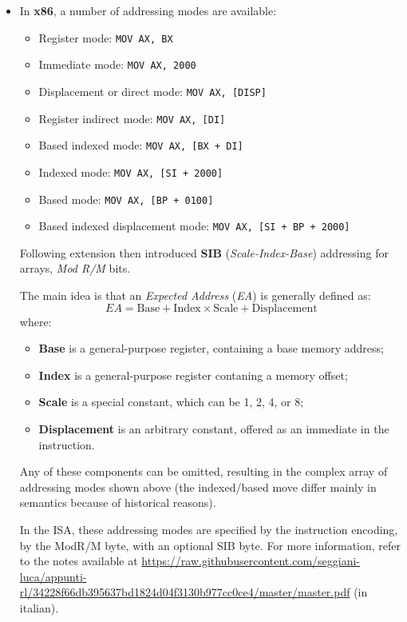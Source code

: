 \documentclass[a4paper,11pt]{article}
\begin{document}
\begin{itemize}
	\item In \textbf{x86}, a number of addressing modes are available:
	\begin{itemize}
		\item Register mode: \lstinline|MOV AX, BX|
		\item Immediate mode: \lstinline|MOV AX, 2000|
		\item Displacement or direct mode: \lstinline|MOV AX, [DISP]|
		\item Register indirect mode: \lstinline|MOV AX, [DI]|
		\item Based indexed mode: \lstinline|MOV AX, [BX + DI]|
		\item Indexed mode: \lstinline|MOV AX, [SI + 2000]|
		\item Based mode: \lstinline|MOV AX, [BP + 0100]|
		\item Based indexed displacement mode: \lstinline|MOV AX, [SI + BP + 2000]|
	\end{itemize}
	Following extension then introduced \textbf{SIB} (\textit{Scale-Index-Base}) addressing for arrays, \textit{Mod R/M} bits.

The main idea is that an \textit{Expected Address} (\textit{EA}) is generally defined as:
$$
\textit{EA} = \text{Base} + \text{Index} \times \text{Scale} + \text{Displacement}
$$
where:
\begin{itemize}
	\item \textbf{Base} is a general-purpose register, containing a base memory address;
	\item \textbf{Index} is a general-purpose register contaning a memory offset;
	\item \textbf{Scale} is a special constant, which can be 1, 2, 4, or 8;
	\item \textbf{Displacement} is an arbitrary constant, offered as an immediate in the instruction.
\end{itemize}

Any of these components can be omitted, resulting in the complex array of addressing modes shown above (the indexed/based move differ mainly in semantics because of historical reasons).

In the ISA, these addressing modes are specified by the instruction encoding, by the ModR/M byte, with an optional SIB byte. For more information, refer to the notes available at \url{https://raw.githubusercontent.com/seggiani-luca/appunti-rl/34228f66db395637bd1824d04f3130b977cc0ce4/master/master.pdf} (in italian). 


\end{itemize}
\end{document}
